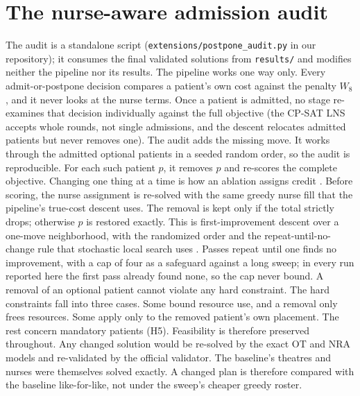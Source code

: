 \documentclass[11pt]{article}
\newcommand{\Hc}[1]{\textsf{H#1}}
\begin{document}
	\section{The nurse-aware admission audit}\label{app:audit}
	The audit is a standalone script (\texttt{extensions/postpone\_audit.py} in our repository); it
	consumes the final validated solutions from \texttt{results/} and modifies neither the pipeline
	nor its results. The pipeline works one way only. Every admit-or-postpone decision compares a patient's own cost against the penalty $W_8$, and it never looks at the nurse terms. Once a patient is admitted, no stage re-examines that decision
	individually against the full objective (the CP-SAT LNS accepts whole rounds, not single
	admissions, and the descent relocates admitted patients but never removes one). The audit adds
	the missing move. It works through the admitted optional patients in a seeded random order, so the audit is reproducible. For each such patient $p$, it removes $p$ and re-scores the complete objective. Changing one thing at a time is how an ablation assigns credit \citep{fawcett2016}. Before scoring, the nurse assignment is re-solved with the same greedy nurse fill that the pipeline's true-cost descent uses. The removal is kept only if the total strictly
	drops; otherwise $p$ is restored exactly. This is first-improvement descent over a one-move
	neighborhood, with the randomized order and the repeat-until-no-change rule that stochastic
	local search uses \citep{hoos2004}. Passes repeat until one finds no improvement, with a cap of four as a safeguard against a long sweep; in every run reported here the first pass already found none, so the cap never bound. A removal of an optional patient cannot violate any hard constraint. The hard constraints fall into three cases. Some bound resource use, and a removal only frees resources. Some apply only to the removed patient's own placement. The rest concern mandatory patients (\Hc5). Feasibility is therefore
	preserved throughout. Any changed solution would be re-solved by the exact OT and NRA models and re-validated by the official validator. The baseline's theatres and nurses were themselves solved exactly. A changed plan is therefore compared with the baseline like-for-like, not under the sweep's cheaper greedy roster.
\end{document}
